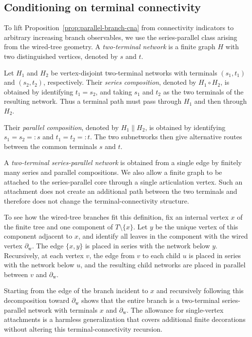 \documentclass[11pt]{amsart}
\theoremstyle{plain}
\theoremstyle{definition}
\theoremstyle{remark}
\begin{document}
\subsection{Conditioning on terminal connectivity}

To lift Proposition~\ref{prop:parallel-branch-cna} from connectivity indicators to arbitrary increasing branch observables, we use the series-parallel class arising from the wired-tree geometry. A \emph{two-terminal network} is a finite graph $H$ with two distinguished vertices, denoted by $s$ and $t$.

Let $H_1$ and $H_2$ be vertex-disjoint two-terminal networks with terminals $(s_1,t_1)$ and $(s_2,t_2)$, respectively. Their \emph{series composition}, denoted by $H_1\circ H_2$, is obtained by identifying $ t_1=s_2$, and taking $s_1$ and $t_2$ as the two terminals of the resulting network. Thus a terminal path must pass through $H_1$ and then through $H_2$.

Their \emph{parallel composition}, denoted by $H_1\parallel H_2$, is obtained by identifying $s_1=s_2=:s$ and $t_1=t_2=:t$. The two subnetworks then give alternative routes between the common terminals $s$ and $t$.

A \emph{two-terminal series-parallel network} is obtained from a single edge by finitely many series and parallel compositions. We also allow a finite graph to be attached to the series-parallel core through a single articulation vertex. Such an attachment does not create an additional path between the two terminals and therefore does not change the terminal-connectivity structure.

To see how the wired-tree branches fit this definition, fix an internal vertex $x$ of the finite tree and one component of $T\setminus\{x\}$. Let $y$ be the unique vertex of this component adjacent to $x$, and identify all leaves in the component with the wired vertex $\partial_{\mathrm w}$. The edge $\{x,y\}$ is placed in series with the network below $y$. Recursively, at each vertex $v$, the edge from $v$ to each child $u$ is placed in series with the network below $u$, and the resulting child networks are placed in parallel between $v$ and $\partial_{\mathrm w}$. 

Starting from the edge of the branch incident to $x$ and recursively following this decomposition toward $\partial_{\mathrm w}$ shows that the entire branch is a two-terminal series-parallel network with terminals $x$ and $\partial_{\mathrm w}$. The allowance for single-vertex attachments is a harmless generalization that covers additional finite decorations without altering this terminal-connectivity recursion.
\end{document}
